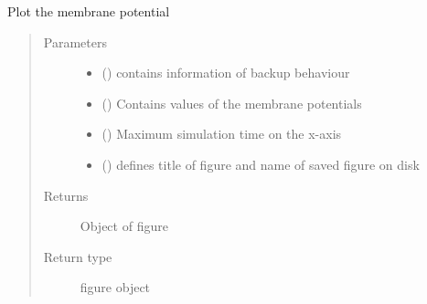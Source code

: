 \documentclass[letterpaper,10pt,english]{sphinxmanual}
\begin{document}
\begin{fulllineitems}
\label{\detokenize{SpikingConvNet:SpikingConvNet.utils.plot_membrane_voltages}}
Plot the membrane potential
\begin{quote}\begin{description}
\item[{Parameters}] \leavevmode\begin{itemize}
\item {} 
 () \textendash{} contains information of backup behaviour

\item {} 
 () \textendash{} Contains values of the membrane potentials

\item {} 
 () \textendash{} Maximum simulation time on the x-axis

\item {} 
 () \textendash{} defines title of figure and name of saved figure on disk

\end{itemize}

\item[{Returns}] \leavevmode
{} \textendash{} Object of figure

\item[{Return type}] \leavevmode
figure object

\end{description}\end{quote}

\end{fulllineitems}

\end{document}
